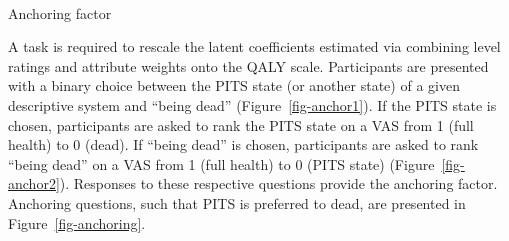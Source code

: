 \documentclass[
  letterpaper,
  DIV=11,
  numbers=noendperiod]{scrartcl}
\makeatletter
\let\oldparagraph\paragraph
\renewcommand{\paragraph}{
    \@ifstar
      \xxxParagraphStar
      \xxxParagraphNoStar
  }
\newcommand{\xxxParagraphStar}[1]{\oldparagraph*{#1}\mbox{}}
\newcommand{\xxxParagraphNoStar}[1]{\oldparagraph{#1}\mbox{}}
\makeatother
\begin{document}
\newpage

\paragraph{Anchoring factor}\label{anchoring-factor}

A task is required to rescale the latent coefficients estimated via
combining level ratings and attribute weights onto the QALY scale.
Participants are presented with a binary choice between the PITS state
(or another state) of a given descriptive system and ``being dead''
(Figure~\ref{fig-anchor1}). If the PITS state is chosen, participants
are asked to rank the PITS state on a VAS from 1 (full health) to 0
(dead). If ``being dead'' is chosen, participants are asked to rank
``being dead'' on a VAS from 1 (full health) to 0 (PITS state)
(Figure~\ref{fig-anchor2}). Responses to these respective questions
provide the anchoring factor. Anchoring questions, such that PITS is
preferred to dead, are presented in Figure~\ref{fig-anchoring}.
\end{document}

